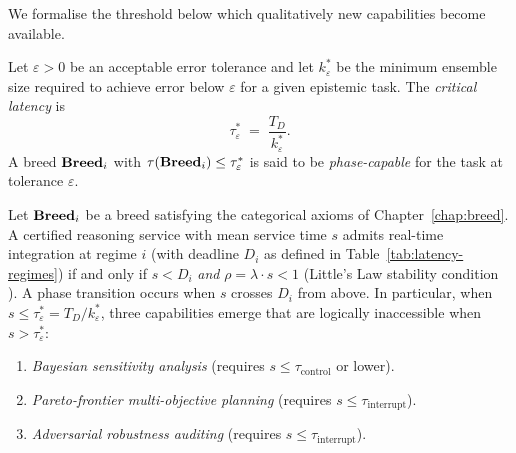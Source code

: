We formalise the threshold below which qualitatively new capabilities become available.

\begin{definition}
\label{def:critical-latency}
Let $\varepsilon > 0$ be an acceptable error tolerance and let $k^*_\varepsilon$ be the
minimum ensemble size required to achieve error below $\varepsilon$ for a given epistemic
task.  The \emph{critical latency} is
\[
  \tau^*_\varepsilon \;=\; \frac{T_D}{k^*_\varepsilon}.
\]
A breed $\mathbf{Breed}_i$ with $\tau(\mathbf{Breed}_i) \leq \tau^*_\varepsilon$ is said to be
\emph{phase-capable} for the task at tolerance $\varepsilon$.
\end{definition}

\begin{theorem}
\label{thm:phase-transition}
\label{thm:speed-phase-transition}
Let $\mathbf{Breed}_i$ be a breed satisfying the categorical axioms of
Chapter~\ref{chap:breed}.  A certified reasoning service with mean service time $s$
admits real-time integration at regime $i$ (with deadline $D_i$ as defined in
Table~\ref{tab:latency-regimes}) if and only if $s < D_i$ \emph{and}
$\rho = \lambda \cdot s < 1$ (Little's Law stability condition \cite{feller1968}).
A phase transition occurs when $s$ crosses $D_i$ from above.  In particular,
when $s \leq \tau^*_\varepsilon = T_D / k^*_\varepsilon$, three capabilities emerge
that are logically inaccessible when $s > \tau^*_\varepsilon$:

\begin{enumerate}[label=(\roman*)]
  \item \emph{Bayesian sensitivity analysis} (requires $s \leq \tau_{\text{control}}$ or lower).
  \item \emph{Pareto-frontier multi-objective planning} (requires $s \leq \tau_{\text{interrupt}}$).
  \item \emph{Adversarial robustness auditing} (requires $s \leq \tau_{\text{interrupt}}$).
\end{enumerate}
\end{theorem}

